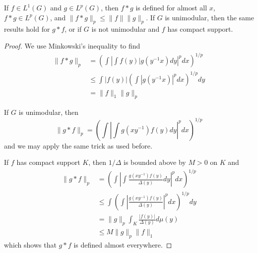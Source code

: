 \begin{theorem}
    If $f \in L^1(G)$ and $g \in L^p(G)$, then $f*g$ is defined for almost all $x$, $f*g \in L^p(G)$, and $\| f*g\|_p \leq \|f \| \| g \|_p$. If $G$ is unimodular, then the same results hold for $g*f$, or if $G$ is not unimodular and $f$ has compact support.
\end{theorem}
\begin{proof}
    We use Minkowski's inequality to find
    \begin{align*}
        \| f*g \|_p &= \left( \int \left| \int f(y) |g(y^{-1}x) dy \right|^{p} dx \right)^{1/p}\\
        &\leq \int |f(y)| \left( \int |g(y^{-1}x)|^p dx \right)^{1/p} dy\\
        &= \| f \|_1 \| g \|_p
    \end{align*}

    If $G$ is unimodular, then
    \[ \| g*f \|_p = \left( \int \left| \int g(xy^{-1}) f(y) dy \right|^{p} dx \right)^{1/p} \]
    and we may apply the same trick as used before.

    If $f$ has compact support $K$, then $1/\Delta$ is bounded above by $M > 0$ on $K$ and
    \begin{align*}
        \| g * f \|_p &= \left( \int \left| \int \frac{ g(xy^{-1}) f(y)}{\Delta(y)} dy \right|^{p} dx \right)^{1/p}\\
        &\leq \int \left( \int \left| \frac{g(xy^{-1}) f(y)}{\Delta(y)} \right|^p dx \right)^{1/p} dy\\
        &= \| g \|_p \int_K \frac{|f(y)|}{\Delta(y)} d \mu(y)\\
        &\leq M \| g \|_p \| f \|_1
    \end{align*}
    which shows that $g*f$ is defined almost everywhere.
\end{proof}

